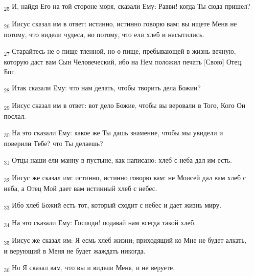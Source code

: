 \begin{tcolorbox}
\textsubscript{25} И, найдя Его на той стороне моря, сказали Ему: Равви! когда Ты сюда пришел?
\end{tcolorbox}
\begin{tcolorbox}
\textsubscript{26} Иисус сказал им в ответ: истинно, истинно говорю вам: вы ищете Меня не потому, что видели чудеса, но потому, что ели хлеб и насытились.
\end{tcolorbox}
\begin{tcolorbox}
\textsubscript{27} Старайтесь не о пище тленной, но о пище, пребывающей в жизнь вечную, которую даст вам Сын Человеческий, ибо на Нем положил печать [Свою] Отец, Бог.
\end{tcolorbox}
\begin{tcolorbox}
\textsubscript{28} Итак сказали Ему: что нам делать, чтобы творить дела Божии?
\end{tcolorbox}
\begin{tcolorbox}
\textsubscript{29} Иисус сказал им в ответ: вот дело Божие, чтобы вы веровали в Того, Кого Он послал.
\end{tcolorbox}
\begin{tcolorbox}
\textsubscript{30} На это сказали Ему: какое же Ты дашь знамение, чтобы мы увидели и поверили Тебе? что Ты делаешь?
\end{tcolorbox}
\begin{tcolorbox}
\textsubscript{31} Отцы наши ели манну в пустыне, как написано: хлеб с неба дал им есть.
\end{tcolorbox}
\begin{tcolorbox}
\textsubscript{32} Иисус же сказал им: истинно, истинно говорю вам: не Моисей дал вам хлеб с неба, а Отец Мой дает вам истинный хлеб с небес.
\end{tcolorbox}
\begin{tcolorbox}
\textsubscript{33} Ибо хлеб Божий есть тот, который сходит с небес и дает жизнь миру.
\end{tcolorbox}
\begin{tcolorbox}
\textsubscript{34} На это сказали Ему: Господи! подавай нам всегда такой хлеб.
\end{tcolorbox}
\begin{tcolorbox}
\textsubscript{35} Иисус же сказал им: Я есмь хлеб жизни; приходящий ко Мне не будет алкать, и верующий в Меня не будет жаждать никогда.
\end{tcolorbox}
\begin{tcolorbox}
\textsubscript{36} Но Я сказал вам, что вы и видели Меня, и не веруете.
\end{tcolorbox}
